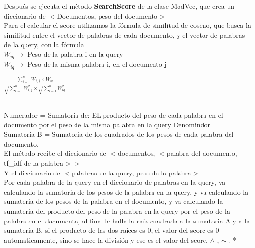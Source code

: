 \documentclass[12pt, a4paper]{article}
\begin{document}
\begin{enumerate}
\begin{itemize}
                        Después se ejecuta el método \textbf{SearchScore} de la clase ModVec,
                        que crea un diccionario de $<$Documentos, peso del documento$>$ \\
                        Para el calcular el score utilizamos la fórmula de similitud de coseno, que busca la similitud
                        entre el vector de palabras de cada documento, y el vector de palabras de la query,
                        con la fórmula\\
                        $W_{iq} \rightarrow$ Peso de la palabra i en la query\\
                        $W_{iq} \rightarrow$ Peso de la misma palabra i, en el documento j\\
                        
                        \quad
                        {
                        \vspace{0.1cm}
                        \begin{center}
                              {\LARGE$\frac{\sum_{i=1}^{n} W_{i,j} \times W_{iq}}{\sqrt{\sum_{i=1}^{n} W_{i,j}^2} \times \sqrt{\sum_{i=1}^{n} W_{iq}^2}}$}
                        \end{center}
                        \vspace{0.5cm}
                        }
                        \quad\\
                        Numerador = Sumatoria de: EL producto del peso de cada palabra en el documento
                        por el peso de la misma palabra en la query
                        Denomindor =
                        Sumatoria B = Sumatoria de los cuadrados de los pesos de cada palabra del documento.\\
                        El método recibe el diccionario de $<$documentos, $<$palabra del documento, tf\_idf de la palabra$>>$\\
                        Y el diccionario de $<$palabras de la query, peso de la palabra$>$\\
                        Por cada palabra de la query en el diccionario de palabras en la query,
                        va calculando la sumatoria de los pesos de la palabra en la query,
                        y va calculando la sumatoria de los pesos de la palabra en el documento, y
                        va calculando la sumatoria del producto del peso de la palabra en la query por
                        el peso de la palabra en el documento, al final le halla la raíz cuadrada a
                        la sumatoria A y a la sumatoria B, si el producto de las dos raíces es 0,
                        el valor del score es 0 automáticamente, sino se hace la división y
                        ese es el valor del score.
                        $\wedge$ , $\sim$ , *


\end{itemize}
\end{enumerate}
\end{document}
